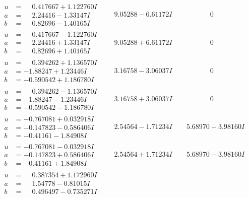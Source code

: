\documentclass[1p]{elsarticle_modified}
\theoremstyle{definition}
\begin{document}
$$\begin{array}{c|c|c}
\begin{aligned}
u &= \phantom{-}0.417667 + 1.122760 I \\
a &= \phantom{-}2.24416 - 1.33147 I \\
b &= \phantom{-}0.82696 - 1.40165 I\end{aligned}
 & \phantom{-}9.05288 - 6.61172 I & \phantom{-0.000000 } 0 \\ \hline\begin{aligned}
u &= \phantom{-}0.417667 - 1.122760 I \\
a &= \phantom{-}2.24416 + 1.33147 I \\
b &= \phantom{-}0.82696 + 1.40165 I\end{aligned}
 & \phantom{-}9.05288 + 6.61172 I & \phantom{-0.000000 } 0 \\ \hline\begin{aligned}
u &= \phantom{-}0.394262 + 1.136570 I \\
a &= -1.88247 + 1.23446 I \\
b &= -0.590542 + 1.186780 I\end{aligned}
 & \phantom{-}3.16758 - 3.06037 I & \phantom{-0.000000 } 0 \\ \hline\begin{aligned}
u &= \phantom{-}0.394262 - 1.136570 I \\
a &= -1.88247 - 1.23446 I \\
b &= -0.590542 - 1.186780 I\end{aligned}
 & \phantom{-}3.16758 + 3.06037 I & \phantom{-0.000000 } 0 \\ \hline\begin{aligned}
u &= -0.767081 + 0.032918 I \\
a &= -0.147823 - 0.586406 I \\
b &= -0.41161 - 1.84908 I\end{aligned}
 & \phantom{-}2.54564 - 1.71234 I & \phantom{-}5.68970 + 3.98160 I \\ \hline\begin{aligned}
u &= -0.767081 - 0.032918 I \\
a &= -0.147823 + 0.586406 I \\
b &= -0.41161 + 1.84908 I\end{aligned}
 & \phantom{-}2.54564 + 1.71234 I & \phantom{-}5.68970 - 3.98160 I \\ \hline\begin{aligned}
u &= \phantom{-}0.387354 + 1.172960 I \\
a &= \phantom{-}1.54778 - 0.81015 I \\
b &= \phantom{-}0.496497 - 0.735271 I\end{aligned}

\end{array}$$
\end{document}
